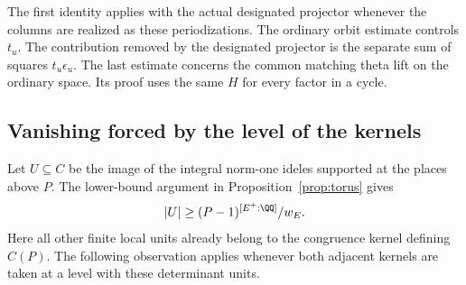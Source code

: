 \documentclass[a4paper,11pt]{article}
\theoremstyle{definition}
\theoremstyle{remark}
\numberwithin{equation}{section}
\begin{document}
The first identity applies with the actual designated
projector whenever the columns are realized as these
periodizations. The ordinary orbit estimate controls \(t_u\).
The contribution removed by the designated projector is
the separate sum of squares \(t_u\epsilon_u\). The last
estimate concerns the common matching theta lift on the
ordinary space. Its proof uses the same \(H\) for every
factor in a cycle.

\subsection{Vanishing forced by the level of the kernels}\label{nav:I-44}
Let \(U\subseteq C\) be the image of the integral norm-one ideles supported at the places above \(P\). The lower-bound argument in Proposition~\ref{prop:torus} gives
\[
             |U|\ge (P-1)^{[E^+:\QQ]}/w_E .
\]
Here all other finite local units already belong to the congruence kernel defining \(C(P)\). The following observation applies whenever both adjacent kernels are taken at a level with these determinant units.
\end{document}
